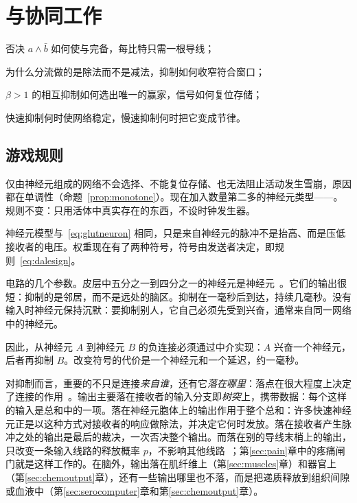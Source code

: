 \chapter{与协同工作}
\label{sec:gaba}
\begin{chaptergoals}
\item 否决 $a\wedge\bar b$ 如何使与完备，每比特只需一根导线；
\item 为什么分流做的是除法而不是减法，抑制如何收窄符合窗口；
\item $\beta>1$ 的相互抑制如何选出唯一的赢家，信号如何复位存储；
\item 快速抑制何时使网络稳定，慢速抑制何时把它变成节律。
\end{chaptergoals}

\section{游戏规则}

仅由神经元组成的网络不会选择、不能复位存储、也无法阻止活动发生雪崩，原因都在单调性（命题~\ref{prop:monotone}）。现在加入数量第二多的神经元类型——。规则不变：只用活体中真实存在的东西，不设时钟发生器。

神经元模型与~\eqref{eq:glutneuron} 相同，只是来自神经元的脉冲不是抬高、而是压低接收者的电压。权重现在有了两种符号，符号由发送者决定，即规则~\eqref{eq:dalesign}。

电路的几个参数。皮层中五分之一到四分之一的神经元是神经元~\cite{Hendry1987}。它们的输出很短：抑制的是邻居，而不是远处的脑区。抑制在一毫秒后到达，持续几毫秒。没有输入时神经元保持沉默：要抑制别人，它自己必须先受到兴奋，通常来自同一网络中的神经元。

因此，从神经元 $A$ 到神经元 $B$ 的负连接必须通过中介实现：$A$ 兴奋一个神经元，后者再抑制 $B$。改变符号的代价是一个神经元和一个延迟，约一毫秒。

对抑制而言，重要的不只是连接\emph{来自谁}，还有它\emph{落在哪里}：落点在很大程度上决定了连接的作用~\cite{Markram2004}。输出主要落在接收者的输入分支即\emph{树突}上，携带数据：每个这样的输入是总和中的一项。落在神经元胞体上的输出作用于整个总和：许多快速神经元正是以这种方式对接收者的响应做除法，并决定它何时发放。落在接收者产生脉冲之处的输出是最后的裁决，一次否决整个输出。而落在别的导线末梢上的输出，只改变一条输入线路的释放概率 $p$，不影响其他线路~\cite{Rudomin1999}；第\ref{sec:pain}章中的疼痛闸门就是这样工作的。在脑外，输出落在肌纤维上（第\ref{sec:muscles}章）和器官上（第\ref{sec:chemoutput}章），还有一些输出哪里也不落，而是把递质释放到组织间隙或血液中（第\ref{sec:serocomputer}章和第\ref{sec:chemoutput}章）。

